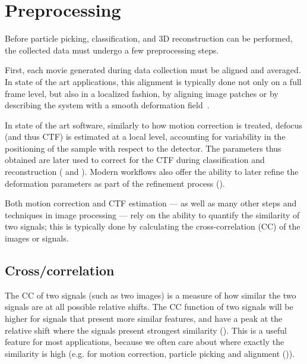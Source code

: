 \section{Preprocessing}\label{em_preprocessing}

Before particle picking, classification, and 3D reconstruction can be performed, the collected data must undergo a few preprocessing steps.

First, each movie generated during data collection must be aligned and averaged.
In state of the art applications, this alignment is typically done not only on a full frame level, but also in a localized fashion, by aligning image patches or by describing the system with a smooth deformation field~\cite{zhengMotionCor2AnisotropicCorrection2017,punjaniCryoSPARCAlgorithmsRapid2017,tegunovRealtimeCryoelectronMicroscopy2019}.

In state of the art software, similarly to how motion correction is treated, defocus (and thus CTF) is estimated at a local level, accounting for variability in the positioning of the sample with respect to the detector.
The parameters thus obtained are later used to correct for the CTF during classification and reconstruction ( and ).
Modern workflows also offer the ability to later refine the deformation parameters as part of the refinement process ().

Both motion correction and CTF estimation --- as well as many other steps and techniques in image processing --- rely on the ability to quantify the similarity of two signals; this is typically done by calculating the cross-correlation (CC) of the images or signals.

\subsection{\texorpdfstring{Cross\-/correlation}{Cross-correlation}}\label{em_cross_correlation}

The CC of two signals (such as two images) is a measure of how similar the two signals are at all possible relative shifts.
The CC function of two signals will be higher for signals that present more similar features, and have a peak at the relative shift where the signals present strongest similarity ().
This is a useful feature for most applications, because we often care about where exactly the similarity is high (e.g. for motion correction, particle picking and alignment ()).

